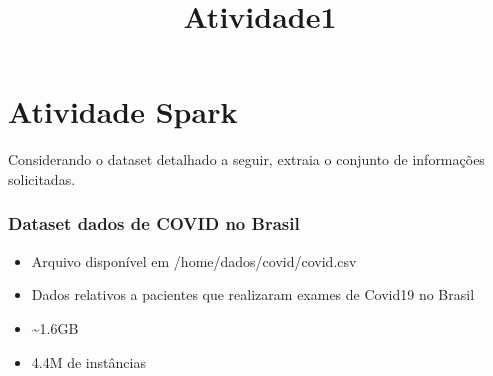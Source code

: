 \documentclass[11pt]{article}
\title{Atividade1}
\providecommand{\tightlist}{%
      \setlength{\itemsep}{0pt}\setlength{\parskip}{0pt}}
\begin{document}
    
    \maketitle
    
    

    
    \hypertarget{atividade-spark}{%
\section{Atividade Spark}\label{atividade-spark}}

Considerando o dataset detalhado a seguir, extraia o conjunto de
informações solicitadas.

\hypertarget{dataset-dados-de-covid-no-brasil}{%
\subsubsection{Dataset dados de COVID no
Brasil}\label{dataset-dados-de-covid-no-brasil}}

\begin{itemize}
\tightlist
\item
  Arquivo disponível em /home/dados/covid/covid.csv
\item
  Dados relativos a pacientes que realizaram exames de Covid19 no Brasil
\item
  \textasciitilde1.6GB
\item
  4.4M de instâncias
\end{itemize}
\end{document}
